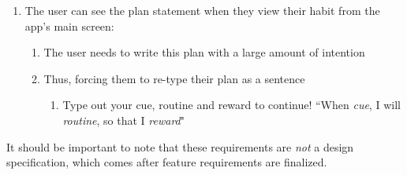 \begin{enumerate}
        \item The user can see the plan statement when they view their habit from the app’s main screen:
        \begin{enumerate}
            \item The user needs to write this plan with a large amount of intention
            \item Thus, forcing them to re-type their plan as a sentence
            \begin{enumerate}
                \item Type out your cue, routine and reward to continue! “When \textit{cue}, I will \textit{routine}, so that I \textit{reward}"
            \end{enumerate}
        \end{enumerate}
    \end{enumerate}
    It should be important to note that these requirements are \textit{not} a design specification, which comes after feature requirements are finalized.




